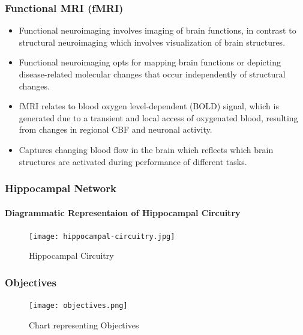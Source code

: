 \documentclass{beamer}
\begin{document}
  \begin{frame}[t]
    \frametitle{Functional MRI (fMRI)}

    \begin{itemize}
      \item Functional neuroimaging involves imaging of brain
        functions, in contrast to structural neuroimaging which
        involves visualization of brain structures. \vskip 10pt

      \item Functional neuroimaging opts for mapping brain functions
        or depicting disease-related molecular changes that occur
        independently of structural changes. \vskip 10pt

      \item fMRI relates to blood oxygen level-dependent (BOLD)
        signal, which is generated due to a transient and local access
        of oxygenated blood, resulting from changes in regional CBF and
        neuronal activity. \vskip 10pt

      \item Captures changing blood flow in the brain which reflects
        which brain structures are activated during performance of
        different tasks.

    \end{itemize}

  \end{frame}

  \begin{frame}[t]
    \frametitle{Hippocampal Network}
    \framesubtitle{Diagrammatic Representaion of Hippocampal Circuitry}

    \vskip 10pt

    \begin{figure}[H]
      \centering
      \texttt{[image: hippocampal-circuitry.jpg]}
      \caption{Hippocampal Circuitry}
    \end{figure}

  \end{frame}

  \begin{frame}[t]
    \frametitle{Objectives}

    \vskip 15pt

    \begin{figure}[H]
      \centering
      \texttt{[image: objectives.png]}
      \caption{Chart representing Objectives}
    \end{figure}

  \end{frame}
\end{document}

